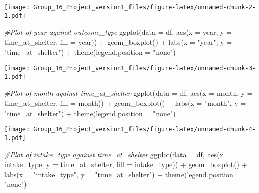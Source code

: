 \documentclass[
]{article}
\newenvironment{Shaded}{\begin{snugshade}}{\end{snugshade}}
\newcommand{\AttributeTok}[1]{\textcolor[rgb]{0.77,0.63,0.00}{#1}}
\newcommand{\CommentTok}[1]{\textcolor[rgb]{0.56,0.35,0.01}{\textit{#1}}}
\newcommand{\FunctionTok}[1]{\textcolor[rgb]{0.00,0.00,0.00}{#1}}
\newcommand{\NormalTok}[1]{#1}
\newcommand{\SpecialCharTok}[1]{\textcolor[rgb]{0.00,0.00,0.00}{#1}}
\newcommand{\StringTok}[1]{\textcolor[rgb]{0.31,0.60,0.02}{#1}}
\begin{document}
\texttt{[image: Group\_16\_Project\_version1\_files/figure-latex/unnamed-chunk-2-1.pdf]}

\begin{Shaded}
\begin{Highlighting}[]
\CommentTok{\#Plot of year against outcome\_type}
\FunctionTok{ggplot}\NormalTok{(}\AttributeTok{data =}\NormalTok{ df, }\FunctionTok{aes}\NormalTok{(}\AttributeTok{x =}\NormalTok{ year, }\AttributeTok{y =}\NormalTok{ time\_at\_shelter, }\AttributeTok{fill =}\NormalTok{ year)) }\SpecialCharTok{+}
  \FunctionTok{geom\_boxplot}\NormalTok{() }\SpecialCharTok{+}
  \FunctionTok{labs}\NormalTok{(}\AttributeTok{x =} \StringTok{"year"}\NormalTok{, }\AttributeTok{y =} \StringTok{"time\_at\_shelter"}\NormalTok{) }\SpecialCharTok{+}
  \FunctionTok{theme}\NormalTok{(}\AttributeTok{legend.position =} \StringTok{"none"}\NormalTok{)}
\end{Highlighting}
\end{Shaded}

\texttt{[image: Group\_16\_Project\_version1\_files/figure-latex/unnamed-chunk-3-1.pdf]}

\begin{Shaded}
\begin{Highlighting}[]
\CommentTok{\#Plot of month against time\_at\_shelter}
\FunctionTok{ggplot}\NormalTok{(}\AttributeTok{data =}\NormalTok{ df, }\FunctionTok{aes}\NormalTok{(}\AttributeTok{x =}\NormalTok{ month, }\AttributeTok{y =}\NormalTok{ time\_at\_shelter, }\AttributeTok{fill =}\NormalTok{ month)) }\SpecialCharTok{+}
  \FunctionTok{geom\_boxplot}\NormalTok{() }\SpecialCharTok{+}
  \FunctionTok{labs}\NormalTok{(}\AttributeTok{x =} \StringTok{"month"}\NormalTok{, }\AttributeTok{y =} \StringTok{"time\_at\_shelter"}\NormalTok{) }\SpecialCharTok{+}
  \FunctionTok{theme}\NormalTok{(}\AttributeTok{legend.position =} \StringTok{"none"}\NormalTok{)}
\end{Highlighting}
\end{Shaded}

\texttt{[image: Group\_16\_Project\_version1\_files/figure-latex/unnamed-chunk-4-1.pdf]}

\begin{Shaded}
\begin{Highlighting}[]
\CommentTok{\#Plot of intake\_type against time\_at\_shelter}
\FunctionTok{ggplot}\NormalTok{(}\AttributeTok{data =}\NormalTok{ df, }\FunctionTok{aes}\NormalTok{(}\AttributeTok{x =}\NormalTok{ intake\_type, }\AttributeTok{y =}\NormalTok{ time\_at\_shelter, }\AttributeTok{fill =}\NormalTok{ intake\_type)) }\SpecialCharTok{+}
  \FunctionTok{geom\_boxplot}\NormalTok{() }\SpecialCharTok{+}
  \FunctionTok{labs}\NormalTok{(}\AttributeTok{x =} \StringTok{"intake\_type"}\NormalTok{, }\AttributeTok{y =} \StringTok{"time\_at\_shelter"}\NormalTok{) }\SpecialCharTok{+}
  \FunctionTok{theme}\NormalTok{(}\AttributeTok{legend.position =} \StringTok{"none"}\NormalTok{)}
\end{Highlighting}
\end{Shaded}
\end{document}
